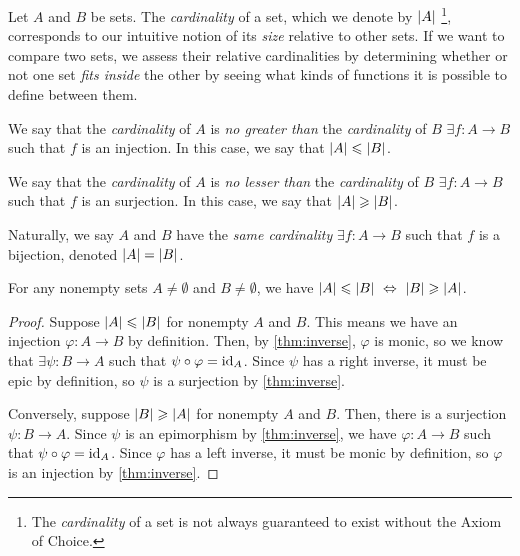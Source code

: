 \begin{definition}[Cardinality]
    Let $A$ and $B$ be sets.
    The \emph{cardinality} of a set,
    which we denote by $\cardinality*{A}$%
    \footnote{The \emph{cardinality} of a set is not always guaranteed to exist without the Axiom of Choice.},
    corresponds to our intuitive notion of its \emph{size} relative to other sets.
    If we want to compare two sets,
    we assess their relative cardinalities by determining whether or not one set \emph{fits inside} the other
    by seeing what kinds of functions it is possible to define between them.

    We say that the \emph{cardinality} of $A$ is \emph{no greater than} the \emph{cardinality} of $B$
    \iffbydefn $\exists f: A \to B$ such that $f$ is an injection.
    In this case, we say that $\cardinality*{A} \leq \cardinality*{B}$.

    We say that the \emph{cardinality} of $A$ is \emph{no lesser than} the \emph{cardinality} of $B$
    \iffbydefn $\exists f: A \to B$ such that $f$ is an surjection.
    In this case, we say that $\cardinality*{A} \geq \cardinality*{B}$.

    Naturally, we say $A$ and $B$ have the \emph{same cardinality}
    \iffbydefn $\exists f: A \to B$ such that $f$ is a bijection,
    denoted $\cardinality*{A} = \cardinality*{B}$.
\end{definition}

\begin{corollary}
    For any nonempty sets $A \neq \emptyset$ and $B \neq \emptyset$, we have
    $\cardinality*{A} \leq \cardinality*{B} \iff \cardinality*{B} \geq \cardinality*{A}$.
\end{corollary}
\begin{proof}
    Suppose $\cardinality*{A} \leq \cardinality*{B}$ for nonempty $A$ and $B$.
    This means we have an injection $\varphi: A \to B$ by definition.
    Then, by \autoref{thm:inverse}, $\varphi$ is monic,
    so we know that $\exists \psi: B \to A$ such that $\psi \circ \varphi = \text{id}_A$.
    Since $\psi$ has a right inverse, it must be epic by definition,
    so $\psi$ is a surjection by \autoref{thm:inverse}.

    Conversely, suppose $\cardinality*{B} \geq \cardinality*{A}$ for nonempty $A$ and $B$.
    Then, there is a surjection $\psi: B \to A$.
    Since $\psi$ is an epimorphism by \autoref{thm:inverse},
    we have $\varphi: A \to B$ such that $\psi \circ \varphi = \text{id}_A$.
    Since $\varphi$ has a left inverse, it must be monic by definition,
    so $\varphi$ is an injection by \autoref{thm:inverse}.
\end{proof}

